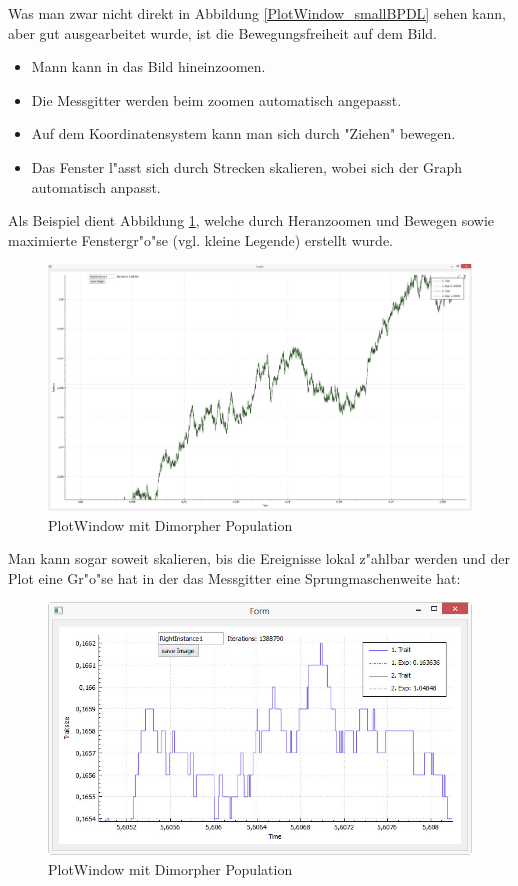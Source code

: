 \documentclass[11pt, a4paper, german]{article}
\theoremstyle{plain}
\begin{document}
	Was man zwar nicht direkt in Abbildung \ref{PlotWindow_smallBPDL} sehen kann, aber gut ausgearbeitet wurde, ist die Bewegungsfreiheit auf dem Bild.\\
	\begin{itemize}
		\item Mann kann in das Bild hineinzoomen.
		\item Die Messgitter werden beim zoomen automatisch angepasst.
		\item Auf dem Koordinatensystem kann man sich durch "{}Ziehen"{} bewegen.
		\item Das Fenster l"asst sich durch Strecken skalieren, wobei sich der Graph automatisch anpasst.
	\end{itemize}
	Als Beispiel dient Abbildung \ref{PlotWindow_zoomedBPDLmaximized}, welche durch Heranzoomen und Bewegen sowie maximierte Fenstergr"o"se (vgl. kleine Legende) erstellt wurde.
	\begin{figure}[H]
		\centering
		\includegraphics[width=1\linewidth]{./Pictures/PlotWindow_zoomedBPDLmaximized}
		\caption[PlotWindow]{PlotWindow mit Dimorpher Population}
		\label{PlotWindow_zoomedBPDLmaximized}
	\end{figure}
	Man kann sogar soweit skalieren, bis die Ereignisse lokal z"ahlbar werden und der Plot eine Gr"o"se hat in der das Messgitter eine Sprungmaschenweite hat:
	\begin{figure}[H]
		\centering
		\includegraphics[width=1\linewidth]{./Pictures/PlotWindow_zoomedBPDL_Stepview}
		\caption[PlotWindow]{PlotWindow mit Dimorpher Population}
		\label{PlotWindow_zoomedBPDL_Stepview}
	\end{figure}	
	
\end{document}
